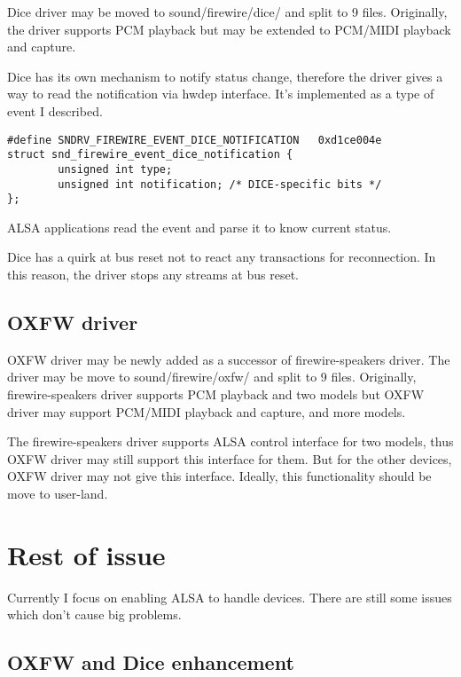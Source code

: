 \documentclass[onecolumn]{article}
\begin{document}
Dice driver may be moved to sound/firewire/dice/ and split to 9 files. Originally, the driver supports PCM playback but may be extended to PCM/MIDI playback and capture.

Dice has its own mechanism to notify status change, therefore the driver gives a way to read the notification via hwdep interface. It's implemented as a type of event I described.

\begin{verbatim}
#define SNDRV_FIREWIRE_EVENT_DICE_NOTIFICATION   0xd1ce004e
struct snd_firewire_event_dice_notification {
        unsigned int type;
        unsigned int notification; /* DICE-specific bits */
};
\end{verbatim}

ALSA applications read the event and parse it to know current status.

Dice has a quirk at bus reset not to react any transactions for reconnection. In this reason, the driver stops any streams at bus reset.


\subsection{OXFW driver}

OXFW driver may be newly added as a successor of firewire-speakers driver. The driver may be move to sound/firewire/oxfw/ and split to 9 files. Originally, firewire-speakers driver supports PCM playback and two models but OXFW driver may support PCM/MIDI playback and capture, and more models.

The firewire-speakers driver supports ALSA control interface for two models, thus OXFW driver may still support this interface for them. But for the other devices, OXFW driver may not give this interface. Ideally, this functionality should be move to user-land.


\section{Rest of issue}

Currently I focus on enabling ALSA to handle devices. There are still some issues which don't cause big problems.

\subsection{OXFW and Dice enhancement}
\end{document}
